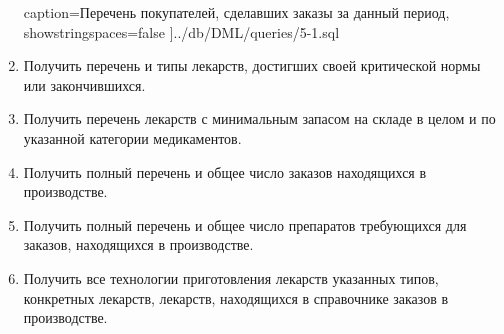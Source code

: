 \documentclass[a4paper]{article}
\begin{document}
\begin{enumerate}
					caption={Перечень покупателей, сделавших заказы за данный период},
					showstringspaces=false
				]{../db/DML/queries/5-1.sql}
				
				
			\item Получить перечень и типы лекарств, достигших своей критической нормы или закончившихся.
				
				
			\item Получить перечень лекарств с минимальным запасом на складе в целом и по указанной категории медикаментов.
				
				
			\item Получить полный перечень и общее число заказов находящихся в производстве.
				
			\item Получить полный перечень и общее число препаратов требующихся для заказов, находящихся в производстве.
				
			\item Получить все технологии приготовления лекарств указанных типов, конкретных лекарств, лекарств, находящихся в справочнике заказов в производстве.

\end{enumerate}
\end{document}
